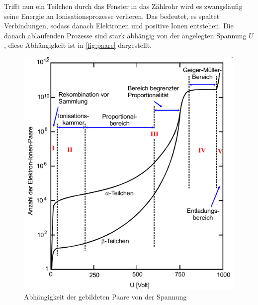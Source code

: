 Trifft nun ein Teilchen durch das Fenster in das Zählrohr wird es zwangsläufig seine Energie an Ionisationsprozesse verlieren.
Das bedeutet, es spaltet Verbindungen, sodass danach Elektronen und positive Ionen entstehen.
Die danach ablaufenden Prozesse sind stark abhängig von der angelegten Spannung $U$, diese Abhängigkeit ist in \autoref{fig:paare} dargestellt.

\begin{figure}
    \centering
    \includegraphics[width=\textwidth]{images/bild3.png}
    \caption{Abhängigkeit der gebildeten Paare von der Spannung}
    \label{fig:paare}
\end{figure}

